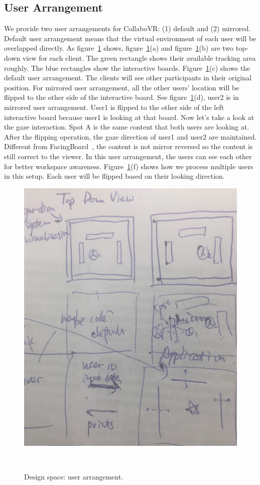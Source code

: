 \documentclass{sigchi}
\begin{document}
\subsection{User Arrangement}
We provide two user arrangements for CollaboVR: (1) default and (2) mirrored. Default user arrangement means that the virtual environment of each user will be overlapped directly. As figure~\ref{fig:userarrangement} shows, figure~\ref{fig:userarrangement}(a) and figure~\ref{fig:userarrangement}(b) are two top-down view for each client. The green rectangle shows their available tracking area roughly. The blue rectangles show the interactive boards. Figure~\ref{fig:userarrangement}(c) shows the default user arrangement. The clients will see other participants in their original position. For mirrored user arrangement, all the other users' location will be flipped to the other side of the interactive board. See figure~\ref{fig:userarrangement}(d), user2 is in mirrored user arrangement. User1 is flipped to the other side of the left interactive board because user1 is looking at that board. Now let's take a look at the gaze interaction. Spot A is the same content that both users are looking at. After the flipping operation, the gaze direction of user1 and user2 are maintained. Different from FacingBoard~\cite{li2014interactive}, the content is not mirror reversed so the content is still correct to the viewer. In this user arrangement, the users can see each other for better workspace awareness. Figure~\ref{fig:userarrangement}(f) shows how we process multiple users in this setup. Each user will be flipped based on their looking direction.

\begin{figure}[t!]
 \centering
 \includegraphics[width=0.9\columnwidth]{userarrangement.jpg}
 \caption{Design space: user arrangement.
 }~\label{fig:userarrangement}
\end{figure}
\end{document}

